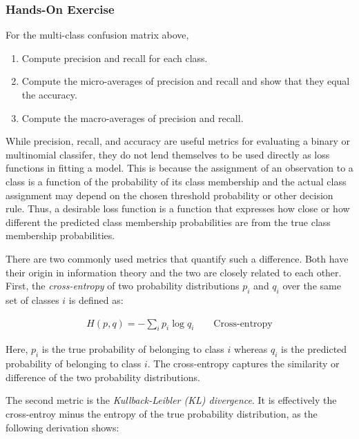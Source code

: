\begin{tcolorbox}[colback=code]
\subsubsection*{Hands-On Exercise}

For the multi-class confusion matrix above,
\begin{enumerate}
  \item Compute precision and recall for each class.
  \item Compute the micro-averages of precision and recall and show that they equal the accuracy.
  \item Compute the macro-averages of precision and recall.
\end{enumerate}
\end{tcolorbox}

While precision, recall, and accuracy are useful metrics for evaluating a binary or multinomial classifer, they do not lend themselves to be used directly as loss functions in fitting a model. This is because the assignment of an observation to a class is a function of the probability of its class membership and the actual class assignment may depend on the chosen threshold probability or other decision rule. Thus, a desirable loss function is a function that expresses how close or how different the predicted class membership probabilities are from the true class membership probabilities. 

There are two commonly used metrics that quantify such a difference. Both have their origin in information theory and the two are closely related to each other. First, the \emph{cross-entropy} of two probability distributions $p_i$ and $q_i$ over the same set of classes $i$ is defined as:

\begin{align*}
H(p, q) = - \sum_i p_i \log q_i \qquad \text{Cross-entropy}
\end{align*}

\noindent Here, $p_i$ is the true probability of belonging to class $i$ whereas $q_i$ is the predicted probability of belonging to class $i$. The cross-entropy captures the similarity or difference of the two probability distributions.

The second metric is the \emph{Kullback-Leibler (KL) divergence}. It is effectively the cross-entroy minus the entropy of the true probability distribution, as the following derivation shows:

